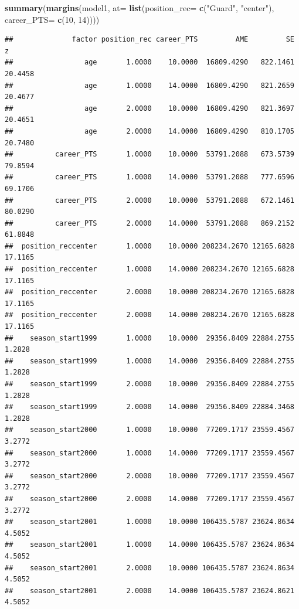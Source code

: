 \documentclass[
]{book}
\newenvironment{Shaded}{\begin{snugshade}}{\end{snugshade}}
\newcommand{\AttributeTok}[1]{\textcolor[rgb]{0.13,0.29,0.53}{#1}}
\newcommand{\DecValTok}[1]{\textcolor[rgb]{0.00,0.00,0.81}{#1}}
\newcommand{\FunctionTok}[1]{\textcolor[rgb]{0.13,0.29,0.53}{\textbf{#1}}}
\newcommand{\NormalTok}[1]{#1}
\newcommand{\StringTok}[1]{\textcolor[rgb]{0.31,0.60,0.02}{#1}}
\begin{document}
\begin{Shaded}
\begin{Highlighting}[]
\FunctionTok{summary}\NormalTok{(}\FunctionTok{margins}\NormalTok{(model1, }\AttributeTok{at=} \FunctionTok{list}\NormalTok{(}\AttributeTok{position\_rec=} \FunctionTok{c}\NormalTok{(}\StringTok{"Guard"}\NormalTok{, }\StringTok{"center"}\NormalTok{),}
                         \AttributeTok{career\_PTS=} \FunctionTok{c}\NormalTok{(}\DecValTok{10}\NormalTok{, }\DecValTok{14}\NormalTok{))))}
\end{Highlighting}
\end{Shaded}

\begin{verbatim}
##              factor position_rec career_PTS         AME         SE       z
##                 age       1.0000    10.0000  16809.4290   822.1461 20.4458
##                 age       1.0000    14.0000  16809.4290   821.2659 20.4677
##                 age       2.0000    10.0000  16809.4290   821.3697 20.4651
##                 age       2.0000    14.0000  16809.4290   810.1705 20.7480
##          career_PTS       1.0000    10.0000  53791.2088   673.5739 79.8594
##          career_PTS       1.0000    14.0000  53791.2088   777.6596 69.1706
##          career_PTS       2.0000    10.0000  53791.2088   672.1461 80.0290
##          career_PTS       2.0000    14.0000  53791.2088   869.2152 61.8848
##  position_reccenter       1.0000    10.0000 208234.2670 12165.6828 17.1165
##  position_reccenter       1.0000    14.0000 208234.2670 12165.6828 17.1165
##  position_reccenter       2.0000    10.0000 208234.2670 12165.6828 17.1165
##  position_reccenter       2.0000    14.0000 208234.2670 12165.6828 17.1165
##    season_start1999       1.0000    10.0000  29356.8409 22884.2755  1.2828
##    season_start1999       1.0000    14.0000  29356.8409 22884.2755  1.2828
##    season_start1999       2.0000    10.0000  29356.8409 22884.2755  1.2828
##    season_start1999       2.0000    14.0000  29356.8409 22884.3468  1.2828
##    season_start2000       1.0000    10.0000  77209.1717 23559.4567  3.2772
##    season_start2000       1.0000    14.0000  77209.1717 23559.4567  3.2772
##    season_start2000       2.0000    10.0000  77209.1717 23559.4567  3.2772
##    season_start2000       2.0000    14.0000  77209.1717 23559.4567  3.2772
##    season_start2001       1.0000    10.0000 106435.5787 23624.8634  4.5052
##    season_start2001       1.0000    14.0000 106435.5787 23624.8634  4.5052
##    season_start2001       2.0000    10.0000 106435.5787 23624.8634  4.5052
##    season_start2001       2.0000    14.0000 106435.5787 23624.8621  4.5052

\end{verbatim}
\end{document}
